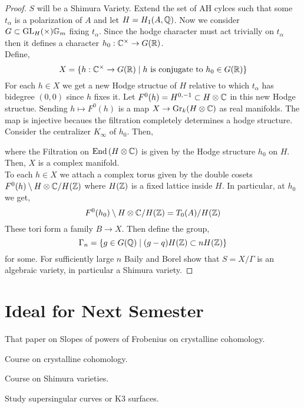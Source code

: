\documentclass[12pt]{article}
\begin{document}
\begin{proof}
$S$ will be a Shimura Variety. Extend the set of AH cylces such that some $t_\alpha$ is a polarization of $A$ and let $H = H_1(A, \mathbb{Q})$. Now we consider $G \subset \mathrm{GL}_{H}(\times) \mathbb{G}_m$ fixing $t_\alpha$. Since the hodge character must act trivially on $t_\alpha$ then it defines a character $h_0 : \mathbb{C}^\times \to G(\mathbb{R})$. 
\bigskip\\
Define,
\[ X = \{ h : \mathbb{C}^\times \to G(\mathbb{R}) \mid h \text{ is conjugate to } h_0 \in G(\mathbb{R}) \} \]
For each $h \in X$ we get a new Hodge structue of $H$ relative to which $t_\alpha$ has bidegree $(0,0)$ since $h$ fixes it. Let $F^0(h) = H^{0,-1} \subset H \otimes \mathbb{C}$ in this new Hodge structue. Sending $h \mapsto F^0(h)$ is a map $X \to \mathrm{Gr}_k(H \otimes \mathbb{C})$ as real manifolds. The map is injective becaues the filtration completely determines a hodge structure. Consider the centralizer $K_\infty$ of $h_0$. Then,
\begin{center}
\end{center}
where the Filtration on $\mathrm{End} \left( H \otimes \mathbb{C} \right)$ is given by the Hodge structure $h_0$ on $H$. Then, $X$ is a complex manifold. 
\bigskip\\
To each $h \in X$ we attach a complex torus given by the double cosets $F^0(h) \setminus H \otimes \mathbb{C} / H(\mathbb{Z})$ where $H(\mathbb{Z})$ is a fixed lattice inside $H$. In particular, at $h_0$ we get,
\[ F^0(h_0) \setminus H \otimes \mathbb{C} / H(\mathbb{Z}) = T_0(A) / H(\mathbb{Z}) \]
These tori form a family $B \to X$. 
Then define the group,
\[ \Gamma_n = \{ g \in G(\mathbb{Q}) \mid (g - q) H(\mathbb{Z}) \subset n H(\mathbb{Z}) \} \]
for some. For sufficiently large $n$ Baily and Borel show that $S = X / \Gamma$ is an algebraic variety, in particular a Shimura variety. 
\end{proof}


\section{Ideal for Next Semester}

That paper on Slopes of powers of Frobenius on crystalline cohomology.

Course on crystalline cohomology.

Course on Shimura varieties.

Study supersingular curves or K3 surfaces.
\end{document}

